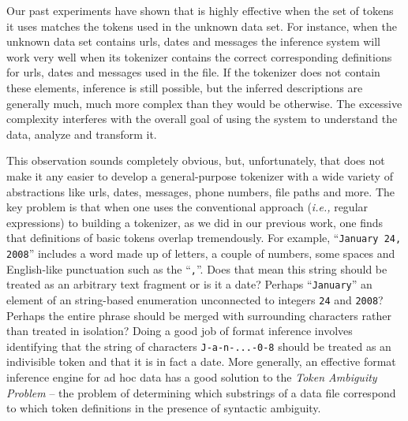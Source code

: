 Our past experiments have shown that \learnpads{} is highly effective
when the set of tokens it uses matches the tokens used in the unknown
data set.  For instance, when the unknown data set contains 
urls, dates and messages the inference system will work very well when
its tokenizer contains the correct corresponding definitions
for urls, dates and messages used in the file.  If the
tokenizer does not contain these elements, inference is still possible,
but the inferred descriptions are generally much, much more complex
than they would be otherwise.  The excessive complexity interferes with
the overall goal of using the system to understand the data, analyze and 
transform it.

This observation sounds completely obvious, but, unfortunately,
that does not make it any easier to develop a general-purpose tokenizer
with a wide variety of abstractions like urls, dates, messages,
phone numbers, file paths and more.  The key problem is that
when one uses the conventional approach ({\em i.e.,} regular expressions)
to building a tokenizer, as we did in our previous work, one finds
that definitions of basic tokens overlap tremendously.  For example,
``{\tt January 24, 2008}'' includes a word made up of letters, a couple 
of numbers,
some spaces and English-like punctuation such as the ``{\tt ,}''.  Does that mean 
this string should be treated as an arbitrary text fragment or 
is it a date? Perhaps ``{\tt January}'' an element of an string-based enumeration 
unconnected to integers {\tt 24} and {\tt 2008}?  Perhaps the entire phrase
should be merged with surrounding characters rather than treated
in isolation?  Doing a good job of format
inference involves identifying that the string of characters
{\tt J-a-n-...-0-8} should be treated as an indivisible token and that it is
in fact a date.  More generally, an effective format inference engine
for ad hoc data has a good solution to the {\em Token Ambiguity Problem}
-- the problem of determining which substrings of a data file correspond
to which token definitions in the presence of syntactic 
ambiguity.

